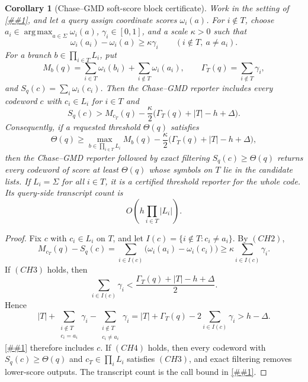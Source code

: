 \documentclass[10pt]{article}
\newcommand{\cref}[1]{\ref{##1}}
\newcommand{\Cref}[1]{\ref{##1}}
\newtheorem{corollary}[theorem]{Corollary}
\theoremstyle{definition}
\begin{document}
\begin{corollary}[Chase--GMD soft-score block certificate]
   \label{cor:chase-gmd-block-certificate}
   Work in the setting of \cref{lem:chase-gmd-reporter}, and let a query assign
   coordinate scores \(\omega_i(a)\).  For \(i\notin T\), choose
   \(a_i\in\operatorname*{arg\,max}_{a\in\Sigma}\omega_i(a)\),
   \(\gamma_i\in[0,1]\), and a scale \(\kappa>0\) such that
   \[
      \omega_i(a_i)-\omega_i(a)\ge\kappa\gamma_i
      \qquad(i\notin T,\ a\ne a_i).
      \tag{CH2}
   \]
   For a branch \(b\in\prod_{i\in T}L_i\), put
   \[
      M_b(q)=
      \sum_{i\in T}\omega_i(b_i)
      +
      \sum_{i\notin T}\omega_i(a_i),
      \qquad
      \Gamma_T(q)=\sum_{i\notin T}\gamma_i,
   \]
   and \(S_q(c)=\sum_i\omega_i(c_i)\).  Then the Chase--GMD reporter includes
   every codeword \(c\) with \(c_i\in L_i\) for \(i\in T\) and
   \[
      S_q(c)>
      M_{c_T}(q)
      -
      \frac{\kappa}{2}\bigl(\Gamma_T(q)+|T|-h+\Delta\bigr).
      \tag{CH3}
   \]
   Consequently, if a requested threshold \(\Theta(q)\) satisfies
   \[
      \Theta(q)\ge
      \max_{b\in\prod_{i\in T}L_i}M_b(q)
      -
      \frac{\kappa}{2}\bigl(\Gamma_T(q)+|T|-h+\Delta\bigr),
      \tag{CH4}
   \]
   then the Chase--GMD reporter followed by exact filtering
   \(S_q(c)\ge\Theta(q)\) returns every codeword of score at least
   \(\Theta(q)\) whose symbols on \(T\) lie in the candidate lists.  If
   \(L_i=\Sigma\) for all \(i\in T\), it is a certified threshold reporter for
   the whole code.  Its query-side transcript count is
   \[
      O\!\left(h\prod_{i\in T}|L_i|\right).
   \]
\end{corollary}

\begin{proof}
   Fix \(c\) with \(c_i\in L_i\) on \(T\), and let
   \(I(c)=\{i\notin T:c_i\ne a_i\}\).  By \((CH2)\),
   \[
      M_{c_T}(q)-S_q(c)
      =
      \sum_{i\in I(c)}
      \bigl(\omega_i(a_i)-\omega_i(c_i)\bigr)
      \ge
      \kappa\sum_{i\in I(c)}\gamma_i .
   \]
   If \((CH3)\) holds, then
   \[
      \sum_{i\in I(c)}\gamma_i
      <
      \frac{\Gamma_T(q)+|T|-h+\Delta}{2}.
   \]
   Hence
   \[
      |T|
      +
      \sum_{\substack{i\notin T\\ c_i=a_i}}\gamma_i
      -
      \sum_{\substack{i\notin T\\ c_i\ne a_i}}\gamma_i
      =
      |T|+\Gamma_T(q)-2\sum_{i\in I(c)}\gamma_i
      >
      h-\Delta .
   \]
   \Cref{lem:chase-gmd-reporter} therefore includes \(c\).  If \((CH4)\)
   holds, then every codeword with \(S_q(c)\ge\Theta(q)\) and \(c_T\in\prod_iL_i\)
   satisfies \((CH3)\), and exact filtering removes lower-score outputs.  The
   transcript count is the call bound in \cref{lem:chase-gmd-reporter}.
\end{proof}
\end{document}
